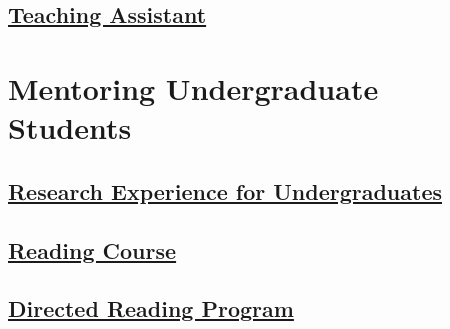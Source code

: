 \documentclass[11pt,letterpaper,roman]{moderncv} %
\newcommand{\mysubsection}[1]{\subsection{\underline{#1}}}
\newcounter{section} \setcounter{section}{1} \newtheorem{theorem}{Theorem}
\begin{document}
\mysubsection{Teaching Assistant}


\section{Mentoring Undergraduate Students}

\newcommand{\drp}[4]{\cvitem{#3 #4}{#1, \textit{#2}}}

\mysubsection{Research Experience for Undergraduates}


\mysubsection{Reading Course}


\mysubsection{Directed Reading Program}



% 
\end{document}
